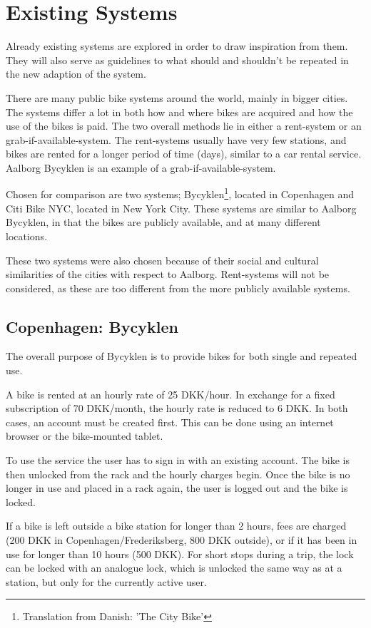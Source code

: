 \section{Existing Systems}
Already existing systems are explored in order to draw inspiration from them.
They will also serve as guidelines to what should and shouldn't be repeated in the new adaption of the system.

There are many public bike systems around the world, mainly in bigger cities.
The systems differ a lot in both how and where bikes are acquired and how the use of the bikes is paid.
The two overall methods lie in either a rent-system or an grab-if-available-system.
The rent-systems usually have very few stations, and bikes are rented for a longer period of time (days), similar to a car rental service.
Aalborg Bycyklen is an example of a grab-if-available-system.

Chosen for comparison are two systems; Bycyklen\footnote{Translation from Danish: 'The City Bike'}, located in Copenhagen and Citi Bike NYC, located in New York City.
These systems are similar to Aalborg Bycyklen, in that the bikes are publicly available, and at many different locations.

These two systems were also chosen because of their social and cultural similarities of the cities with respect to Aalborg.
Rent-systems will not be considered, as these are too different from the more publicly available systems.

\subsection{Copenhagen: Bycyklen}
The overall purpose of Bycyklen\cite{cph_bycyklen}\cite{cph_bycyklen_conditions} is to provide bikes for both single and repeated use.

A bike is rented at an hourly rate of 25 DKK/hour.
In exchange for a fixed subscription of 70 DKK/month, the hourly rate is reduced to 6 DKK.
In both cases, an account must be created first.
This can be done using an internet browser or the bike-mounted tablet.

To use the service the user has to sign in with an existing account.
The bike is then unlocked from the rack and the hourly charges begin.
Once the bike is no longer in use and placed in a rack again, the user is logged out and the bike is locked.

If a bike is left outside a bike station for longer than 2 hours, fees are charged (200 DKK in Copenhagen/Frederiksberg, 800 DKK outside), or if it has been in use for longer than 10 hours (500 DKK).
For short stops during a trip, the lock can be locked with an analogue lock, which is unlocked the same way as at a station, but only for the currently active user.

